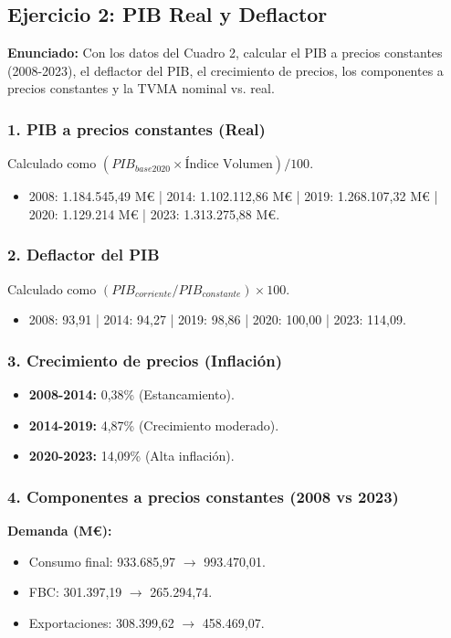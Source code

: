 \subsection{Ejercicio 2: PIB Real y Deflactor}

\textbf{Enunciado:} Con los datos del Cuadro 2, calcular el PIB a precios constantes (2008-2023), el deflactor del PIB, el crecimiento de precios, los componentes a precios constantes y la TVMA nominal vs. real.

\subsubsection{1. PIB a precios constantes (Real)}
Calculado como $(PIB_{base2020} \times \text{Índice Volumen}) / 100$.
\begin{itemize}
    \item 2008: 1.184.545,49 M€ | 2014: 1.102.112,86 M€ | 2019: 1.268.107,32 M€ | 2020: 1.129.214 M€ | 2023: 1.313.275,88 M€.
\end{itemize}

\subsubsection{2. Deflactor del PIB}
Calculado como $(PIB_{corriente} / PIB_{constante}) \times 100$.
\begin{itemize}
    \item 2008: 93,91 | 2014: 94,27 | 2019: 98,86 | 2020: 100,00 | 2023: 114,09.
\end{itemize}

\subsubsection{3. Crecimiento de precios (Inflación)}
\begin{itemize}
    \item \textbf{2008-2014:} 0,38\% (Estancamiento).
    \item \textbf{2014-2019:} 4,87\% (Crecimiento moderado).
    \item \textbf{2020-2023:} 14,09\% (Alta inflación).
\end{itemize}

\subsubsection{4. Componentes a precios constantes (2008 vs 2023)}
\textbf{Demanda (M€):}
\begin{itemize}
    \item Consumo final: 933.685,97 $\rightarrow$ 993.470,01.
    \item FBC: 301.397,19 $\rightarrow$ 265.294,74.
    \item Exportaciones: 308.399,62 $\rightarrow$ 458.469,07.
\end{itemize}

